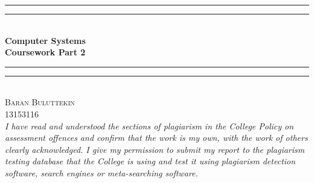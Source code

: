 \documentclass[12pt]{article}
\begin{document}
    \begin{titlepage}
        \begin{center}
            \vspace*{.06\textheight}{\scshape\LARGE Birkbeck, University of London\par}\vspace{1.5cm} %
            \rule[0.5ex]{\linewidth}{2pt}\vspace*{-\baselineskip}\vspace*{3.2pt}
            \rule[0.5ex]{\linewidth}{1pt}\\[\baselineskip]
            \huge{\bfseries Computer Systems\\Coursework Part 2}\\[4mm]
            \rule[0.5ex]{\linewidth}{1pt}\vspace*{-\baselineskip}\vspace{3.2pt}
            \rule[0.5ex]{\linewidth}{2pt}\\
            [2.5cm]
        
            \textsc{\Large Baran Buluttekin\\13153116}\\
            [1.5cm]
            \large \textit{ I have read and understood the sections of plagiarism in the College Policy on assessment offences and confirm that the work is my own, with the work of others clearly acknowledged. I give my permission to submit my report to the plagiarism testing database that the College is using and test it using plagiarism detection software, search engines or meta-searching software.}


        \end{center}
    \end{titlepage}
\end{document}
